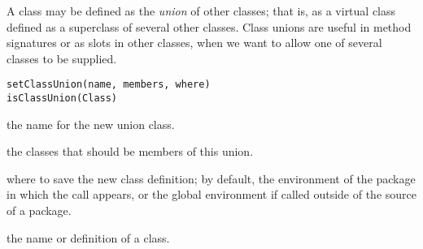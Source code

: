 %
\begin{Description}\relax
A class may be defined as the \emph{union} of other classes; that
is, as a virtual class defined as a superclass of several other
classes. Class unions are useful in method signatures or as slots in
other classes, when we want to allow one of several classes to be supplied.
\end{Description}
%
\begin{Usage}
\begin{verbatim}
setClassUnion(name, members, where)
isClassUnion(Class)
\end{verbatim}
\end{Usage}
%
\begin{Arguments}
\begin{ldescription}
\item[\code{name}]  the name for the new union class. 
\item[\code{members}]  the classes that should be members of this union.
\item[\code{where}]  where to save the new class definition; by default,
the environment of the package in which the 
call appears, or the global environment if called outside of the
source of a package.


\item[\code{Class}]  the name or definition of a class.

\end{ldescription}
\end{Arguments}
%
